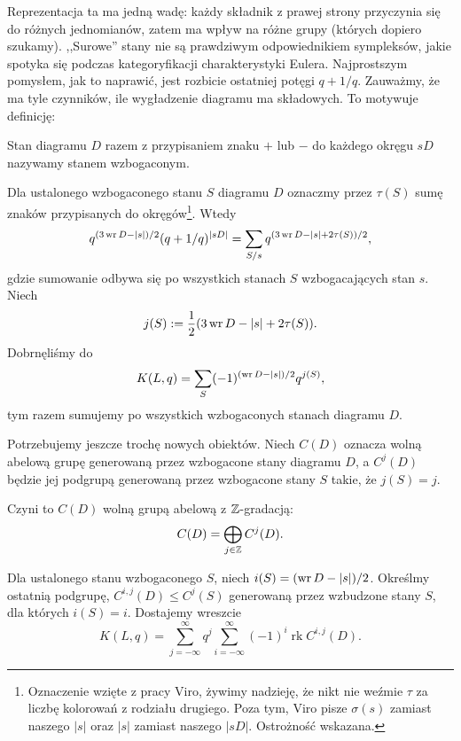 Reprezentacja ta ma jedną wadę: każdy składnik z prawej strony przyczynia się do różnych jednomianów, zatem ma wpływ na różne grupy (których dopiero szukamy).
,,Surowe'' stany nie są prawdziwym odpowiednikiem sympleksów, jakie spotyka się podczas kategoryfikacji charakterystyki Eulera.
Najprostszym pomysłem, jak to naprawić, jest rozbicie ostatniej potęgi $q + 1/q$.
Zauważmy, że ma tyle czynników, ile wygładzenie diagramu ma składowych.
To motywuje definicję:

\begin{definition}
%
    Stan diagramu $D$ razem z przypisaniem znaku $+$ lub $-$ do każdego okręgu $sD$ nazywamy stanem wzbogaconym.
\end{definition}

Dla ustalonego wzbogaconego stanu $S$ diagramu $D$ oznaczmy przez $\tau(S)$ sumę znaków przypisanych do okręgów\footnote{Oznaczenie wzięte z pracy Viro, żywimy nadzieję, że nikt nie weźmie $\tau$ za liczbę kolorowań z rodziału drugiego. Poza tym, Viro pisze $\sigma(s)$ zamiast naszego $|s|$ oraz $|s|$ zamiast naszego $|sD|$. Ostrożność wskazana.}.
Wtedy
\begin{equation}
    q^{(3 \operatorname{wr} D - |s|)/2} (q + 1/q)^{|sD|} = \sum_{S/s} q^{(3 \operatorname{wr} D - |s| + 2 \tau(S))/2},
\end{equation}
gdzie sumowanie odbywa się po wszystkich stanach $S$ wzbogacających stan $s$.
Niech
\begin{equation}
    j(S) := \frac 12 (3 \operatorname{wr} D - |s| + 2 \tau(S)).
\end{equation}
Dobrnęliśmy do
\begin{equation}
    K(L, q) = \sum_S (-1)^{(\operatorname{wr} D - |s|)/2} q^{j(S)},
\end{equation}
tym razem sumujemy po wszystkich wzbogaconych stanach diagramu $D$.

Potrzebujemy jeszcze trochę nowych obiektów.
Niech $C(D)$ oznacza wolną abelową grupę generowaną przez wzbogacone stany diagramu $D$, a $C^j(D)$ będzie jej podgrupą generowaną przez wzbogacone stany $S$ takie, że $j(S) = j$.

Czyni to $C(D)$ wolną grupą abelową z $\mathbb Z$-gradacją:
\begin{equation}
    C(D) = \bigoplus_{j \in \mathbb Z} C^j (D).
\end{equation}

Dla ustalonego stanu wzbogaconego $S$, niech $i(S) = (\operatorname{wr} D - |s|)/2$.
Określmy ostatnią podgrupę, $C^{i,j}(D) \le C^j(S)$ generowaną przez wzbudzone stany $S$, dla których $i(S) = i$.
Dostajemy wreszcie
\begin{equation}
    K(L, q) = \sum_{j = -\infty}^\infty q^j \sum_{i = -\infty}^\infty (-1)^i \operatorname{rk} C^{i, j}(D).
\end{equation}

